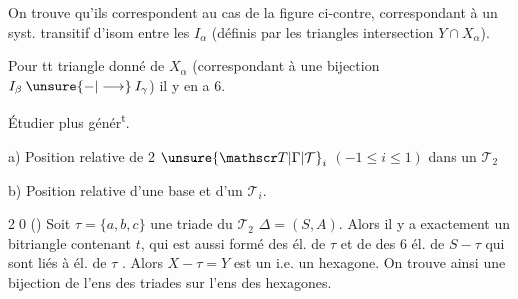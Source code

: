 On trouve qu'ils correspondent au cas de  la figure ci-contre, correspondant à un syst. transitif d'isom entre les $I_\alpha$ (définis par les triangles intersection $Y\cap X_\alpha$).


Pour tt triangle donné de $X_\alpha$ (correspondant à une bijection $I_\beta\mathbin{\unsure{-|\longrightarrow}}I_\gamma$) il y en a 6.

\begin{center}\end{center}

Étudier plus génér\textsuperscript{t}.

a) Position relative de 2 $\unsure{\mathscr T|\Gamma|\mathcal T}_i$ $(-1\le i\le1)$ dans un $\mathscr T_2$

b) Position relative d'une base et d'un $\mathscr T_i$.

\textcircled{20} () Soit $\tau=\{a,b,c\}$ une triade du $\mathscr T_2$ $\Delta=(S,A)$. Alors  il y a exactement un bitriangle contenant $t$, qui est aussi formé des él. de $\tau$ et de  des 6 él. de $S-\tau$ qui sont liés à     él. de $\tau$ .
Alors $X-\tau=Y$ est un   i.e. un hexagone. On trouve ainsi une bijection de l'ens des triades sur l'ens des hexagones.


